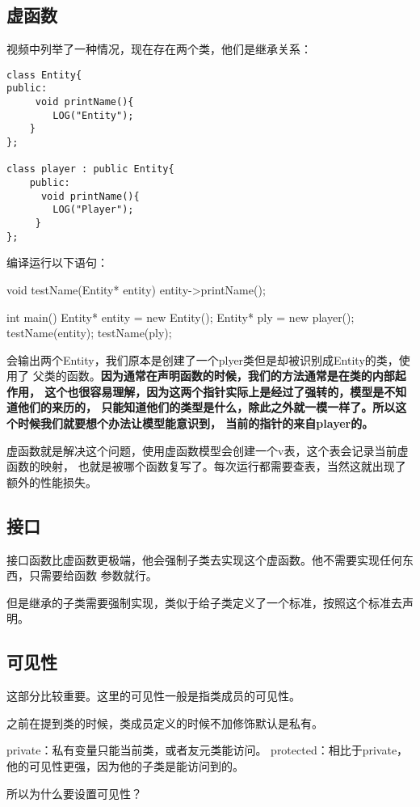 \documentclass{article}
\begin{document}
\begin{sloppypar}
\subsection{虚函数}
视频中列举了一种情况，现在存在两个类，他们是继承关系：
\begin{lstlisting}
class Entity{
public:
     void printName(){
        LOG("Entity");
    }
};

class player : public Entity{
    public:
      void printName(){
        LOG("Player");
     }
};

\end{lstlisting}
编译运行以下语句：
\begin{outline}
void testName(Entity* entity){
    entity->printName();
}

int main()
{
    Entity* entity = new Entity();
    Entity* ply = new player();
    testName(entity);
    testName(ply);
}
\end{outline}
会输出两个Entity，我们原本是创建了一个plyer类但是却被识别成Entity的类，使用了
父类的函数。\textbf{因为通常在声明函数的时候，我们的方法通常是在类的内部起作用，
这个也很容易理解，因为这两个指针实际上是经过了强转的，模型是不知道他们的来历的，
只能知道他们的类型是什么，除此之外就一模一样了。所以这个时候我们就要想个办法让模型能意识到，
当前的指针的来自player的。}

虚函数就是解决这个问题，使用虚函数模型会创建一个v表，这个表会记录当前虚函数的映射，
也就是被哪个函数复写了。每次运行都需要查表，当然这就出现了额外的性能损失。

\subsection{接口}
接口函数比虚函数更极端，他会强制子类去实现这个虚函数。他不需要实现任何东西，只需要给函数
参数就行。

但是继承的子类需要强制实现，类似于给子类定义了一个标准，按照这个标准去声明。

\subsection{可见性}
这部分比较重要。这里的可见性一般是指类成员的可见性。

之前在提到类的时候，类成员定义的时候不加修饰默认是私有。

\begin{outline}
	\1 private：私有变量只能当前类，或者友元类能访问。
    \1 protected：相比于private，他的可见性更强，因为他的子类是能访问到的。
\end{outline}
所以为什么要设置可见性？


\end{sloppypar}
\end{document}
